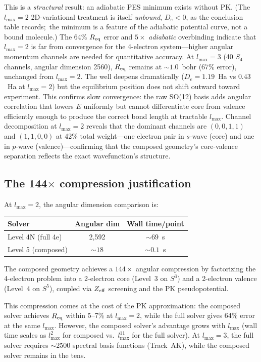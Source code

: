 \documentclass[aps,pra,twocolumn,superscriptaddress,longbibliography,floatfix]{revtex4-2}
\begin{document}
This is a \emph{structural} result: an adiabatic PES minimum exists
without PK.  (The $l_{\max}=2$ 2D-variational treatment is itself \emph{unbound},
$D_e<0$, as the conclusion table records;\ the minimum is a feature of the adiabatic potential curve, not a bound molecule.)  The 64\% $R_{\rm eq}$ error
and $5{\times}$ \emph{adiabatic} overbinding
indicate that $l_{\max} = 2$ is far from convergence for the
4-electron system---higher angular momentum channels are needed for
quantitative accuracy.  At $l_{\max} = 3$ (40 $S_4$ channels,
angular dimension 2560), $R_{\rm eq}$ remains at ${\sim}1.0$~bohr
(67\% error), unchanged from $l_{\max} = 2$.  The well deepens
dramatically ($D_e = 1.19$~Ha vs $0.43$~Ha at $l_{\max} = 2$) but the
equilibrium position does not shift outward toward experiment.  This
confirms slow convergence: the raw SO(12) basis adds angular
correlation that lowers $E$ uniformly but cannot differentiate core
from valence efficiently enough to produce the correct bond length at
tractable $l_{\max}$.  Channel decomposition at $l_{\max} = 2$ reveals
that the dominant channels are $(0,0,1,1)$ and $(1,1,0,0)$ at 42\%
total weight---one electron pair in $s$-wave (core) and one in
$p$-wave (valence)---confirming that the composed geometry's
core-valence separation reflects the exact wavefunction's structure.

\subsection{The 144$\times$ compression justification}

At $l_{\max} = 2$, the angular dimension comparison is:
\begin{center}
\begin{tabular}{lcc}
\toprule
Solver & Angular dim & Wall time/point \\
\midrule
Level 4N (full 4e) & 2,592 & ${\sim}69$~s \\
Level 5 (composed) & ${\sim}18$ & ${\sim}0.1$~s \\
\bottomrule
\end{tabular}
\end{center}
The composed geometry achieves a $144{\times}$ angular compression
by factorizing the 4-electron problem into a 2-electron core (Level~3
on $S^3$) and a 2-electron valence (Level~4 on $S^5$), coupled via
$Z_{\rm eff}$ screening and the PK pseudopotential.

This compression comes at the cost of the PK approximation: the
composed solver achieves $R_{\rm eq}$ within 5--7\% at $l_{\max} = 2$,
while the full solver gives 64\% error at the same $l_{\max}$.
However, the composed solver's advantage grows with $l_{\max}$
(wall time scales as $l_{\max}^2$ for composed vs.\ $l_{\max}^{11}$
for the full solver).  At $l_{\max} = 3$, the full solver requires
${\sim}2500$ spectral basis functions (Track~AK), while the composed
solver remains in the tens.
\end{document}
